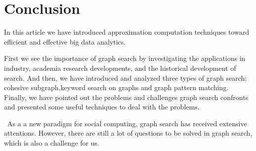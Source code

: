 \section{Conclusion}
\label{sec-conclusion}

In this article we have introduced approximation computation techniques toward efficient and effective big data analytics. 


First we see the importance of graph search by investigating the applications in industry, academia research developments, and the historical development of search.
And then, we have introduced and analyzed three types of graph search: cohesive subgraph,keyword search on graphs and graph
pattern matching. Finally, we have pointed out the problems and challenges graph search confronts and presented some useful techniques to deal with the problems.\par
\, As a a new paradigm for social computing, graph search has received extensive attentions. However, there are still a lot of questions to be solved in graph search, which is also a challenge for us.\par
